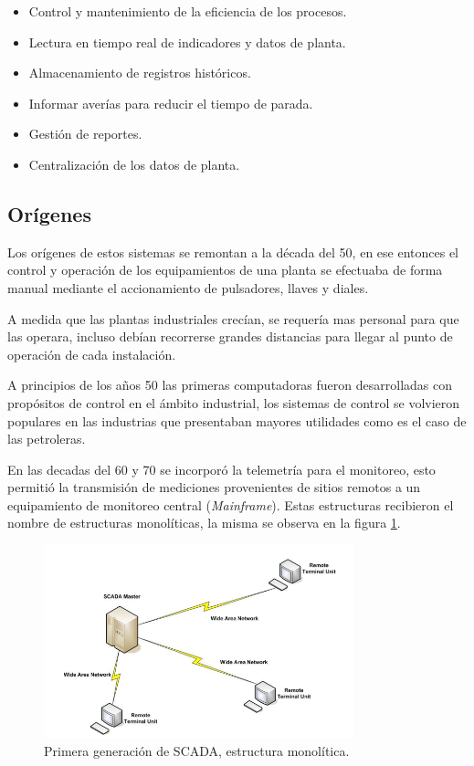 \begin{itemize}
	\item Control y mantenimiento de la eficiencia de los procesos.
	\item Lectura en tiempo real de indicadores y datos de planta.
	\item Almacenamiento de registros históricos.
	\item Informar averías para reducir el tiempo de parada. 
	\item Gestión de reportes.
	\item Centralización de los datos de planta.
\end{itemize}

\subsection{Orígenes}

Los orígenes de estos sistemas se remontan a la década del 50, en ese entonces el control y operación de los equipamientos de una planta se efectuaba de forma manual mediante el accionamiento de pulsadores, llaves y diales.

A medida que las plantas industriales crecían, se requería mas personal para que las operara, incluso debían recorrerse grandes distancias para llegar al punto de operación de cada instalación.

A principios de los años 50 las primeras computadoras fueron desarrolladas con propósitos de control en el ámbito industrial, los sistemas de control se volvieron populares en las industrias que presentaban mayores utilidades como es el caso de las petroleras.

En las decadas del 60 y 70 se incorporó la telemetría para el monitoreo, esto permitió la transmisión de mediciones provenientes de sitios remotos a un equipamiento de monitoreo central (\textit{Mainframe}). Estas estructuras recibieron el nombre de estructuras monolíticas, la misma se observa en la figura \ref{fig:SCMON}.

\begin{figure}[htbp]
	\centering
	\includegraphics[width=0.8\textwidth]{./Figures/SCADA_MONOLITICO.png }
	\caption{Primera generación de SCADA, estructura monolítica.\citep{BOOK:2}}
	\label{fig:SCMON}
\end{figure}

